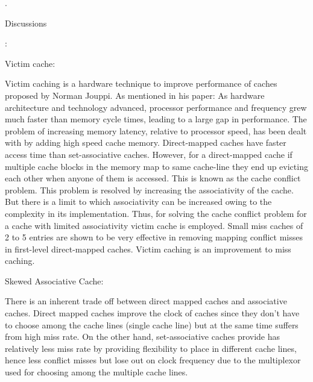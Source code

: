 \documentclass[12pt]{article}
\begin{document}
{\fontsize{18pt}{21.6pt}. {\fontsize{22pt}{26.4pt}\selectfont Discussions{\fontsize{18pt}{21.6pt}\selectfont :\par}\par}\par}\par

{\fontsize{18pt}{21.6pt} Victim cache:\par}\par

{\fontsize{16pt}{19.2pt}\selectfont Victim caching is a hardware technique to improve performance of caches proposed by Norman Jouppi. As mentioned in his paper: As hardware architecture and technology advanced, processor performance and frequency grew much faster than memory cycle times, leading to a large gap in performance. The problem of increasing memory latency, relative to processor speed, has been dealt with by adding high speed cache memory. Direct-mapped caches have faster access time than set-associative caches. However, for a direct-mapped cache if multiple cache blocks in the memory map to same cache-line they end up evicting each other when anyone of them is accessed. This is known as the cache conﬂict problem. This problem is resolved by increasing the associativity of the cache. But there is a limit to which associativity can be increased owing to the complexity in its implementation. Thus, for solving the cache conﬂict problem for a cache with limited associativity victim cache is employed. Small miss caches of 2 to 5 entries are shown to be very eﬀective in removing mapping conﬂict misses in ﬁrst-level direct-mapped caches. Victim caching is an improvement to miss caching.\par}\par

{\fontsize{18pt}{21.6pt} Skewed Associative Cache:\par}\par

{\fontsize{16pt}{19.2pt}\selectfont There is an inherent trade off between direct mapped caches and associative caches. Direct mapped caches improve the clock of caches since they don’t have to choose among the cache lines (single cache line) but at the same time suffers from high miss rate. On the other hand, set-associative caches provide has relatively less miss rate by providing flexibility to place in different cache lines, hence less conflict misses but lose out on clock frequency due to the multiplexor used for choosing among the multiple cache lines.\par}\par
\end{document}
